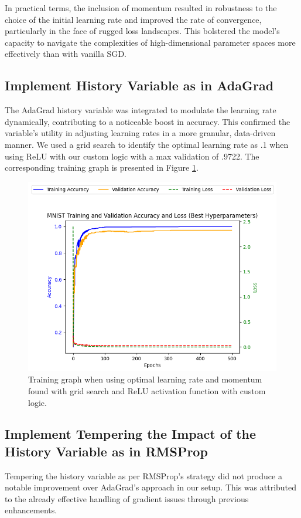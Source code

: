 \documentclass[letterpaper]{article}
\begin{document}
In practical terms, the inclusion of momentum resulted in robustness to the choice of the initial learning rate and improved the rate of convergence, particularly in the face of rugged loss landscapes. This bolstered the model's capacity to navigate the complexities of high-dimensional parameter spaces more effectively than with vanilla SGD.


\subsection{Implement History Variable as in AdaGrad}
\label{subsec:adagrad}
The AdaGrad history variable was integrated to modulate the learning rate dynamically, contributing to a noticeable boost in accuracy. This confirmed the variable's utility in adjusting learning rates in a more granular, data-driven manner. We used a grid search to identify the optimal learning rate as .1 when using ReLU with our custom logic with a max validation of .9722. The corresponding training graph is presented in Figure \ref{fig:custom_relu_history_optimal}.
\begin{figure}[h]
    \centering
    \includegraphics[width=0.8\linewidth]{custom_relu_history_optimal.png} %
    \caption{Training graph when using optimal learning rate and momentum found with grid search and ReLU activation function with custom logic.}
    \label{fig:custom_relu_history_optimal}
\end{figure}

\subsection{Implement Tempering the Impact of the History Variable as in RMSProp}
\label{subsec:rmsprop}
Tempering the history variable as per RMSProp's strategy did not produce a notable improvement over AdaGrad's approach in our setup. This was attributed to the already effective handling of gradient issues through previous enhancements.
\end{document}
